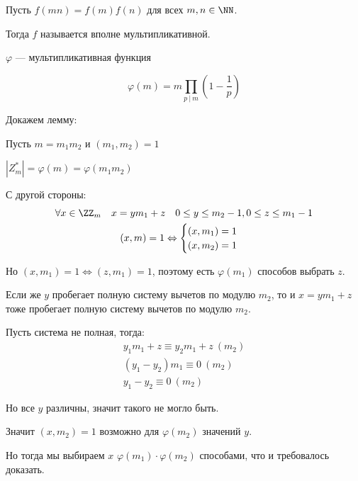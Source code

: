 \begin{remark}{}{}
    Пусть \( f(mn) = f(m)f(n) \) для всех \( m, n \in \NN \).

    Тогда \( f \) называется вполне мультипликативной.
\end{remark}

\begin{lemma}{}{}
    \( \varphi \) --- мультипликативная функция
\end{lemma}

\begin{coroll}{}{}
    \[
        \varphi(m) = m \prod\limits_{p \: | \: m} \left( 1 - \frac{1}{p} \right)
    \]
\end{coroll}

Докажем лемму:

Пусть \( m = m_1 m_2 \) и \( (m_1, m_2) = 1 \)

\( | Z_m^* | = \varphi(m) = \varphi(m_1 m_2) \)

С другой стороны:
\begin{gather*}
    \forall x \in \ZZ_m \quad x = ym_1 + z \quad 0 \leq y \leq m_2 - 1, 0 \leq z \leq m_1 - 1
    \\
    (x, m) = 1
        \Leftrightarrow
        \begin{cases}
            (x, m_1) = 1
            \\
            (x, m_2) = 1
        \end{cases}
\end{gather*}

Но \( (x, m_1) = 1 \Leftrightarrow (z, m_1) = 1 \), поэтому есть \( \varphi(m_1) \) способов выбрать \( z \).

Если же \( y \) пробегает полную систему вычетов по модулю \( m_2 \), то и \( x = ym_1 + z \)
тоже пробегает полную систему вычетов по модулю \( m_2 \).

Пусть система не полная, тогда:
\begin{gather*}
    y_1 m_1 + z \equiv y_2 m_1 + z \: (m_2)
    \\
    (y_1 - y_2)m_1 \equiv 0 \: (m_2)
    \\
    y_1 - y_2 \equiv 0 \: (m_2)
\end{gather*}

Но все \( y \) различны, значит такого не могло быть.

Значит \( (x, m_2) = 1 \) возможно для \( \varphi(m_2) \) значений \( y \).

Но тогда мы выбираем \( x \) \( \varphi(m_1) \cdot \varphi(m_2) \) способами, что и требовалось доказать.

